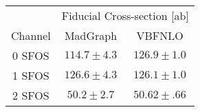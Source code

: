 \begin{tabular}{|c||c|c|}
\hline
        & \multicolumn{2}{|c|}{Fiducial Cross-section [ab]} \\
Channel & MadGraph & VBFNLO \\
\hline\hline
0 SFOS &  $114.7 \pm 4.3$     & $126.9 \pm 1.0$      \\
1 SFOS &  $126.6 \pm 4.3$     & $126.1 \pm 1.0$       \\
2 SFOS &  $50.2 \pm 2.7$     & $50.62 \pm .66$       \\
\hline
\end{tabular}
